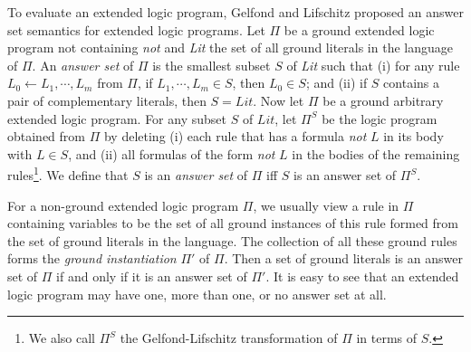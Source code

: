 \documentclass{tlp}
\begin{document}
To evaluate an extended logic program, Gelfond and
Lifschitz proposed an answer set semantics for extended logic
programs. 
Let $\Pi$ be a ground extended logic program not containing {\em not}
and {\em Lit} the set of all ground literals in the language of $\Pi$.
An {\em answer set} of $\Pi$ 
is the smallest subset $S$ of {\em Lit} such that
(i) for any rule $L_{0}\leftarrow L_{1},\cdots,L_{m}$ from
$\Pi$, if $L_{1},\cdots,L_{m}\in S$, then $L_{0}\in S$; and (ii)
if $S$ contains a pair of complementary literals, then
$S=Lit$.
Now let $\Pi$ be a ground arbitrary extended logic program. For any subset $S$
of $Lit$, let $\Pi^{S}$ be the logic program obtained
from $\Pi$ by deleting
(i) each rule that has a formula
{\em not} $L$ in its body with $L\in S$, and
(ii) all formulas of the form {\em not} $L$ in the bodies
of the remaining rules\footnote{We also
call $\Pi^{S}$ the Gelfond-Lifschitz transformation of
$\Pi$ in terms of $S$.}.
We define that $S$ is an {\em answer set} of $\Pi$
iff $S$ is an answer set of $\Pi^{S}$.

For a non-ground extended logic program $\Pi$, we usually view a rule
in $\Pi$ containing variables to be the set of all ground instances of this
rule formed from the set of ground literals in the language. The 
collection of all these ground rules forms the 
{\em ground instantiation} $\Pi'$ of $\Pi$. 
Then a set of ground literals is an answer set of
$\Pi$ if and only if it is an answer set of $\Pi'$.
%
It is easy to see that an
extended logic program may have one, more than one, or
no answer set at all.
\end{document}
